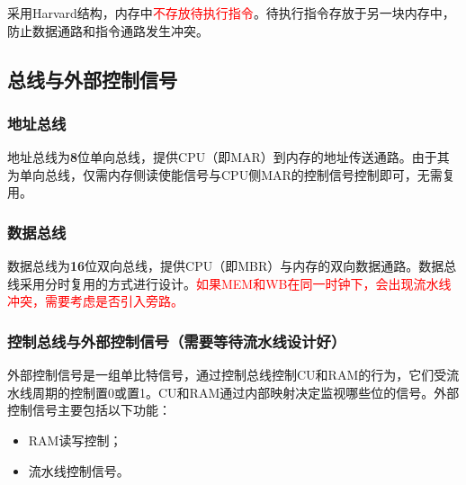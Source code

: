 \documentclass[lang=cn,a4paper,newtx]{elegantpaper}
\begin{document}
采用Harvard结构，内存中\textcolor{red}{不存放待执行指令}。待执行指令存放于另一块内存中，防止数据通路和指令通路发生冲突。
\subsection{总线与外部控制信号}\label{sec:ExternalControl}

\subsubsection{地址总线}
地址总线为\textbf{8}位单向总线，提供CPU（即MAR）到内存的地址传送通路。由于其为单向总线，仅需内存侧读使能信号与CPU侧MAR的控制信号控制即可，无需复用。
\subsubsection{数据总线}
数据总线为\textbf{16}位双向总线，提供CPU（即MBR）与内存的双向数据通路。数据总线采用分时复用的方式进行设计。\textcolor{red}{如果MEM和WB在同一时钟下，会出现流水线冲突，需要考虑是否引入旁路。}
\subsubsection{控制总线与外部控制信号（需要等待流水线设计好）}
外部控制信号是一组单比特信号，通过控制总线控制CU和RAM的行为，它们受流水线周期的控制置0或置1。CU和RAM通过内部映射决定监视哪些位的信号。外部控制信号主要包括以下功能：
\begin{itemize}
  \item RAM读写控制；
  \item 流水线控制信号。
\end{itemize}
\end{document}
